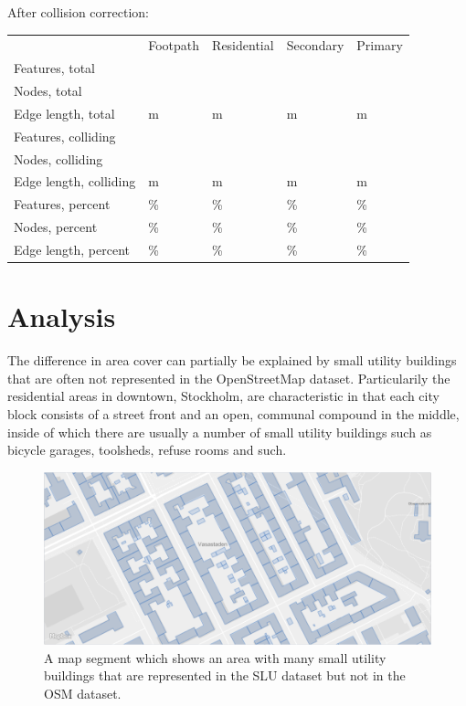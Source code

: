 \documentclass[a4paper]{article}
\begin{document}
After collision correction:

\begin{table}[H]
\begin{tabular}{lllll}
                            & Footpath      & Residential  & Secondary   & Primary     \\
    Features, total         & & & & \\
    Nodes, total            & & & & \\
    Edge length, total      & m & m & m & m \\
    Features, colliding     & & & & \\
    Nodes, colliding        & & & & \\
    Edge length, colliding  & m & m & m & m \\
    Features, percent       & \% & \% & \% & \% \\
    Nodes, percent          & \% & \% & \% & \% \\
    Edge length, percent    & \% & \% & \% & \%

\end{tabular}
\end{table}

\section{Analysis}

The difference in area cover can partially be explained by small utility buildings that are often not represented in the OpenStreetMap dataset. Particularily the residential areas in downtown, Stockholm, are characteristic in that each city block consists of a street front and an open, communal compound in the middle, inside of which there are usually a number of small utility buildings such as bicycle garages, toolsheds, refuse rooms and such.

\begin{figure}[H]
    \centering
    \includegraphics[width=\textwidth,height=0.5\textheight,keepaspectratio]{img_map_utility_buildings}
    \caption{A map segment which shows an area with many small utility buildings that are represented in the SLU dataset but not in the OSM dataset.}
    \label{fig:space}
\end{figure}
\end{document}

